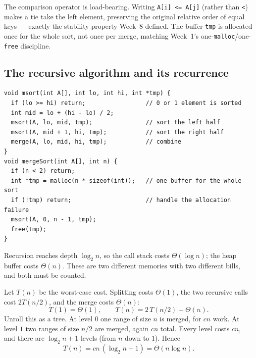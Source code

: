 \documentclass[11pt]{article}
\begin{document}
The comparison operator is load-bearing. Writing \texttt{A[i] <= A[j]} (rather than \texttt{<}) makes a tie take the left element, preserving the original relative order of equal keys --- exactly the stability property Week~8 defined. The buffer \texttt{tmp} is allocated once for the whole sort, not once per merge, matching Week~1's one-\texttt{malloc}/one-\texttt{free} discipline.

\subsection{The recursive algorithm and its recurrence}

\begin{verbatim}
void msort(int A[], int lo, int hi, int *tmp) {
  if (lo >= hi) return;                 // 0 or 1 element is sorted
  int mid = lo + (hi - lo) / 2;
  msort(A, lo, mid, tmp);               // sort the left half
  msort(A, mid + 1, hi, tmp);           // sort the right half
  merge(A, lo, mid, hi, tmp);           // combine
}
void mergeSort(int A[], int n) {
  if (n < 2) return;
  int *tmp = malloc(n * sizeof(int));   // one buffer for the whole sort
  if (!tmp) return;                     // handle the allocation failure
  msort(A, 0, n - 1, tmp);
  free(tmp);
}
\end{verbatim}

Recursion reaches depth $\log_2 n$, so the call stack costs $\Theta(\log n)$; the heap buffer costs $\Theta(n)$. These are two different memories with two different bills, and both must be counted.

Let $T(n)$ be the worst-case cost. Splitting costs $\Theta(1)$, the two recursive calls cost $2T(n/2)$, and the merge costs $\Theta(n)$:
\[
  T(1) = \Theta(1), \qquad T(n) = 2\,T(n/2) + \Theta(n).
\]
Unroll this as a tree. At level $0$ one range of size $n$ is merged, for $cn$ work. At level $1$ two ranges of size $n/2$ are merged, again $cn$ total. Every level costs $cn$, and there are $\log_2 n + 1$ levels (from $n$ down to $1$). Hence
\[
  T(n) = cn\,(\log_2 n + 1) = \Theta(n\log n).
\]
\end{document}
